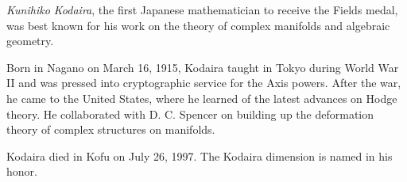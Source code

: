 \documentclass[12pt]{article}
\begin{document}

\emph{Kunihiko Kodaira}, the first Japanese mathematician to receive the Fields medal, was best known for his work on the theory of complex manifolds and algebraic geometry.

Born in Nagano on March 16, 1915, Kodaira taught in Tokyo during World War II and was pressed into cryptographic service for the Axis powers. After the war, he came to the United States, where he learned of the latest advances on Hodge theory. He collaborated with D. C. Spencer on building up the deformation theory of complex structures on manifolds.

Kodaira died in Kofu on July 26, 1997. The Kodaira dimension is named in his honor.
\end{document}
